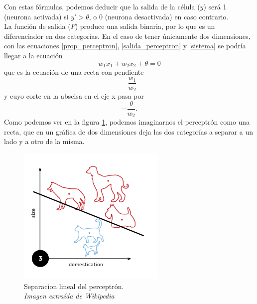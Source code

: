 Con estas fórmulas, podemos deducir que la salida de la célula (${y}$) será 1 (neurona activada) si ${y' > \theta}$, o 0 (neurona desactivada) en caso contrario.\\
La función de salida (${F}$) produce una salida binaria, por lo que es un diferenciador en dos categorías. En el caso de tener únicamente dos dimensiones, con las ecuaciones \ref{prop_perceptron}, \ref{salida_perceptron} y \ref{sistema} se podría llegar a la ecuación
\begin{equation}
w_{1}x_{1} + w_{2}x_{2} + \theta = 0
\end{equation}
que es la ecuación de una recta con pendiente \begin{equation}-\frac{w_{1}}{w_{2}}\end{equation} y cuyo corte en la abscisa en el eje x pasa por \begin{equation}-\frac{\theta}{w_{2}}.\end{equation}
Como podemos ver en la figura \ref{perceptron_recta}, podemos imaginarnos el perceptrón como una recta, que en un gráfica de dos dimensiones deja las dos categorías a separar a un lado y a otro de la misma.
\begin{figure}[htp]
\centering
\includegraphics[scale=0.5]{images/Perceptron_example.png}
\caption{Separacion lineal del perceptrón.\\\textit{Imagen extraída de Wikipedia}}
\label{perceptron_recta}
\end{figure}
